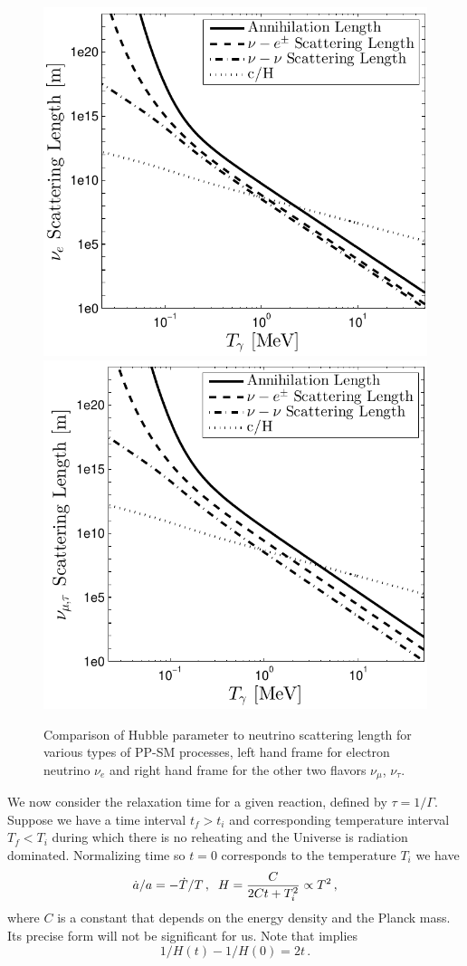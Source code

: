 \begin{figure} 
\centerline{\includegraphics[width=0.5\linewidth]{plots/nu_e_scattering_length_eta_0_23.pdf}
\includegraphics[width=0.5\linewidth]{plots/nu_mu_scattering_length_eta_0_23.pdf}}
\caption{Comparison of Hubble parameter to neutrino scattering length for various types of PP-SM processes, left hand frame for electron neutrino $\nu_e$ and right hand frame for the other two flavors $\nu_\mu$, $\nu_\tau$.  }\label{fig:scattLength}
\end{figure}

We now consider the relaxation time for a given reaction, defined by $\tau=1/\Gamma$. Suppose we have a time interval $t_f>t_i$ and corresponding temperature interval $T_f<T_i$ during which there is no reheating and the Universe is radiation dominated. Normalizing time so $t=0$ corresponds to the temperature $T_i$ we have
\begin{equation}\label{ch6:Heq}
\dot a/a=-\dot T/T\,,\hspace{2mm} H=\frac{C}{2Ct+T_i^2}\propto T^2
\,,
\end{equation}
where $C$ is a constant that depends on the energy density and the Planck mass. Its precise form will not be significant for us. Note that  implies
\begin{equation}
1/H(t)-1/H(0)=2t\,.
\end{equation}

